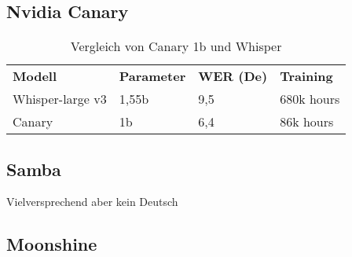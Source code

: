 \subsection{Nvidia Canary}
\citet{canary}

\begin{table}
\begin{tabulary}{\textwidth}{lLll}
\toprule
\textbf{Modell} & \textbf{Parameter} & \textbf{WER (De)} & \textbf{Training}\\
Whisper-large v3 & 1,55b & 9,5 & 680k hours\\
Canary & 1b & 6,4 & 86k hours\\
\bottomrule
\end{tabulary}
\caption{Vergleich von Canary 1b und Whisper}
\label{tab:Canary vs Whisper}
\end{table}

\subsection{Samba}
\citet{samba}
Vielversprechend aber kein Deutsch

\subsection{Moonshine}
